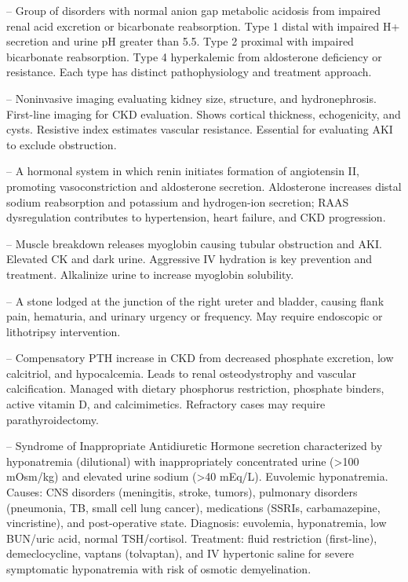 -- Group of disorders with normal anion gap metabolic acidosis from impaired renal acid excretion or bicarbonate reabsorption. Type 1 distal with impaired H+ secretion and urine pH greater than 5.5. Type 2 proximal with impaired bicarbonate reabsorption. Type 4 hyperkalemic from aldosterone deficiency or resistance. Each type has distinct pathophysiology and treatment approach.

-- Noninvasive imaging evaluating kidney size, structure, and hydronephrosis. First-line imaging for CKD evaluation. Shows cortical thickness, echogenicity, and cysts. Resistive index estimates vascular resistance. Essential for evaluating AKI to exclude obstruction.

-- A hormonal system in which renin initiates formation of angiotensin II, promoting vasoconstriction and aldosterone secretion. Aldosterone increases distal sodium reabsorption and potassium and hydrogen-ion secretion; RAAS dysregulation contributes to hypertension, heart failure, and CKD progression.

-- Muscle breakdown releases myoglobin causing tubular obstruction and AKI. Elevated CK and dark urine. Aggressive IV hydration is key prevention and treatment. Alkalinize urine to increase myoglobin solubility.

-- A stone lodged at the junction of the right ureter and bladder, causing flank pain, hematuria, and urinary urgency or frequency. May require endoscopic or lithotripsy intervention.

-- Compensatory PTH increase in CKD from decreased phosphate excretion, low calcitriol, and hypocalcemia. Leads to renal osteodystrophy and vascular calcification. Managed with dietary phosphorus restriction, phosphate binders, active vitamin D, and calcimimetics. Refractory cases may require parathyroidectomy.

-- Syndrome of Inappropriate Antidiuretic Hormone secretion characterized by hyponatremia (dilutional) with inappropriately concentrated urine (>100 mOsm/kg) and elevated urine sodium (>40 mEq/L). Euvolemic hyponatremia. Causes: CNS disorders (meningitis, stroke, tumors), pulmonary disorders (pneumonia, TB, small cell lung cancer), medications (SSRIs, carbamazepine, vincristine), and post-operative state. Diagnosis: euvolemia, hyponatremia, low BUN/uric acid, normal TSH/cortisol. Treatment: fluid restriction (first-line), demeclocycline, vaptans (tolvaptan), and IV hypertonic saline for severe symptomatic hyponatremia with risk of osmotic demyelination.

